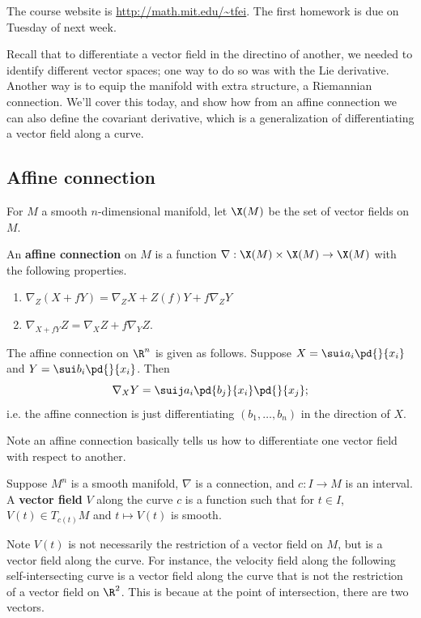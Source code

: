
The course website is
\url{http://math.mit.edu/\~tfei}. The first homework is due on Tuesday of next week.

Recall that to differentiate a vector field in the directino of another, we needed to identify different vector spaces; one way to do so was with the Lie derivative. Another way is to equip the manifold with extra structure, a Riemannian connection. We'll cover this today, and show how from an affine connection we can also define the covariant derivative, which is a generalization of differentiating a vector field along a curve.

\subsection{Affine connection}

For $M$ a smooth $n$-dimensional manifold, let $\X(M)$ be the set of vector fields on $M$.

\begin{df}
An \textbf{affine connection} on $M$ is a function $\nabla:\X(M)\times \X(M)\to \X(M)$ with the following properties.
\begin{enumerate}
\item
$\nabla_Z(X+fY)=\nabla_ZX+Z(f)Y+f\nabla_ZY$
\item
$\nabla_{X+fY}Z=\nabla_XZ+f\nabla_YZ$.
\end{enumerate}
\end{df}
\begin{ex}
The affine connection on $\R^n$ is given as follows. Suppose $X=\sui a_i\pd{}{x_i}$ and $Y=\sui b_i\pd{}{x_i}$. Then
\[
\nabla_XY=\suij a_{i}\pd{b_j}{x_i}\pd{}{x_j};
\]
i.e. the affine connection is just differentiating $(b_1,\ldots, b_n)$ in the direction of $X$.
\end{ex}

Note an affine connection basically tells us how to differentiate one vector field with respect to another.

\begin{df}
Suppose $M^n$ is a smooth manifold, $\nabla$ is a connection, and $c:I\to M$ is an interval. A \textbf{vector field} $V$ along the curve $c$ is a function such that for $t\in I$, $V(t)\in T_{c(t)}M$ and $t\mapsto V(t)$ is smooth. 
\end{df}
Note $V(t)$ is not necessarily the restriction of a vector field on $M$, but is a vector field along the curve. For instance, the velocity field along the following self-intersecting curve is a vector field along the curve that is not the restriction of a vector field on $\R^2$. This is becaue at the point of intersection, there are two vectors.

